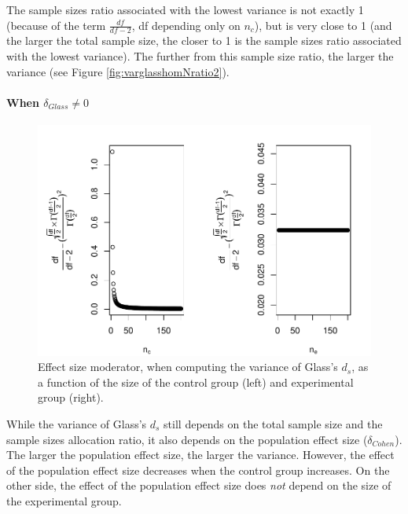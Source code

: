 \documentclass[
  man]{apa6}
\begin{document}
The sample sizes ratio associated with the lowest variance is not exactly 1 (because of the term \(\frac{df}{df-2}\), df depending only on \(n_c\)), but is very close to 1 (and the larger the total sample size, the closer to 1 is the sample sizes ratio associated with the lowest variance). The further from this sample size ratio, the larger the variance (see Figure \ref{fig:varglasshomNratio2}).

\hypertarget{when-delta_glass-neq-0}{%
\paragraph{\texorpdfstring{When \(\delta_{Glass} \neq 0\)}{When \textbackslash delta\_\{Glass\} \textbackslash neq 0}}\label{when-delta_glass-neq-0}}

\begin{figure}
\centering
\includegraphics{Theoretical-Variance-of-all-estimators-as-a-function-of-population-parameters_files/figure-latex/ESmoderatorGlassNsize2-1.pdf}
\caption{\label{fig:ESmoderatorGlassNsize2}Effect size moderator, when computing the variance of Glass's \(d_s\), as a function of the size of the control group (left) and experimental group (right).}
\end{figure}

While the variance of Glass's \(d_s\) still depends on the total sample size and the sample sizes allocation ratio, it also depends on the population effect size (\(\delta_{Cohen}\)). The larger the population effect size, the larger the variance. However, the effect of the population effect size decreases when the control group increases. On the other side, the effect of the population effect size does \emph{not} depend on the size of the experimental group.
\end{document}
